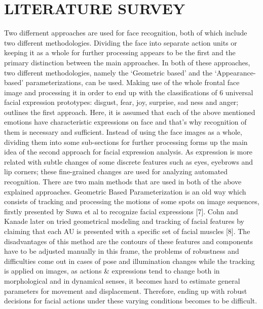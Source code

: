 \documentclass[12pt,a4paper,final]{extreport}
\begin{document}
\newpage
\chapter{LITERATURE SURVEY}
\vspace{0.5cm}
Two differnent approaches are used for face recognition, both of which include two
different methodologies.  Dividing the face into separate action units or keeping it as
a whole for further processing appears to be the first and the primary distinction between the
main approaches.  In both of these approaches, two different methodologies, namely the
‘Geometric based’ and the ‘Appearance-based’ parameterizations, can be used.
\vspace{0.5cm}
Making use of the whole frontal face image and processing it in order to end up with the
classifications of 6 universal facial expression prototypes: disgust, fear, joy, surprise, sad ness
and anger; outlines the first approach. Here, it is assumed that each of the above mentioned
emotions have characteristic expressions on face and that’s why recognition of them is
necessary and sufficient. Instead of using the face images as a whole, dividing them into some
sub-sections for further processing forms up the main idea of the second approach for facial
expression analysis. As expression is more related with subtle changes of some discrete
features such as eyes, eyebrows and lip corners; these fine-grained changes are used for
analyzing automated recognition.
\vspace{0.5cm}
There are two main methods that are used in both of the above explained approaches. Geometric
Based Parameterization is an old way which consists of tracking and processing the motions
of some spots on image sequences, firstly presented by Suwa et al to recognize facial
expressions [7]. Cohn and Kanade later on tried geometrical modeling and tracking of facial
features by claiming that each AU is presented with a specific set of facial muscles [8]. The
disadvantages of this method are the contours of these features and components have to be
adjusted manually in this frame, the problems of robustness and difficulties come out in cases
of pose and illumination changes while the tracking is applied on images, as actions \&
expressions tend to change both in morphological and in dynamical senses, it becomes hard to
estimate general parameters for movement and displacement. Therefore, ending up with robust
decisions for facial actions under these varying conditions becomes to be difficult.
\vspace{0.5cm}
\end{document}
